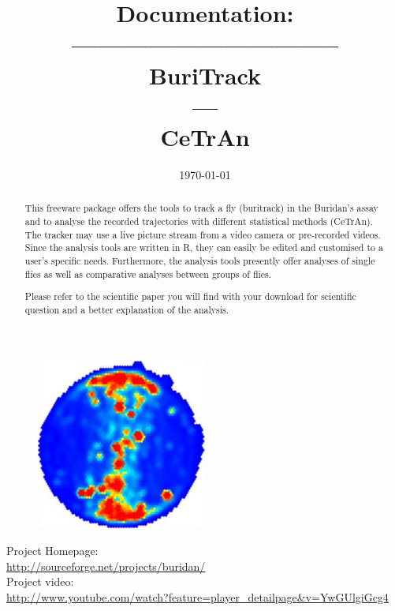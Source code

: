 \documentclass[11pt,a4paper]{article}
\newcommand{\changefont}[3]{
\fontfamily{#1} \fontseries{#2} \fontshape{#3} \selectfont}
\begin{document}
\changefont{pbk}{m}{n}

\title{Documentation: \\ -------------------------------- \\ BuriTrack \\ --- \\ CeTrAn}
\date{\today}
\maketitle
\begin{center}
\begin{figure}[h]
	\centerline{
    	\mbox{\includegraphics[width=0.5\textwidth]{figures/occupancy_plot.eps}}
  	\label{fig:title}
	}
 \end{figure}
\parskip 1cm
Project Homepage: \\
\url{http://sourceforge.net/projects/buridan/} \\
Project video:\\
\url{http://www.youtube.com/watch?feature=player_detailpage&v=YwGUlgiGcg4}
\end{center}

\thispagestyle{empty}
\newpage

\tableofcontents

\newpage

\begin{abstract}
This freeware package offers the tools to track a fly (buritrack) in the Buridan's assay and to analyse the recorded trajectories with different statistical methods (CeTrAn). The tracker may use a live picture stream from a video camera or pre-recorded videos. Since the analysis tools are written in R, they can easily be edited and customised to a user's specific needs. Furthermore, the analysis tools presently offer analyses of single flies as well as comparative analyses between groups of flies.  

Please refer to the scientific paper you will find with your download for scientific question and a better explanation of the analysis.
\end{abstract}
\end{document}
